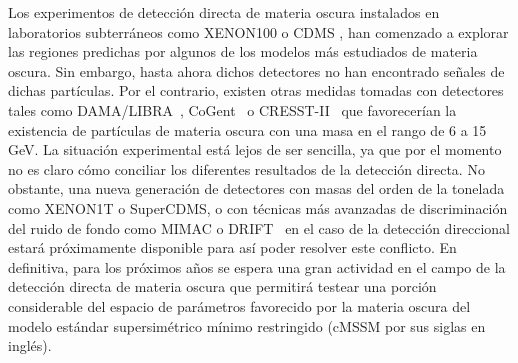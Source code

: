 Los experimentos de detección directa de materia oscura instalados en
laboratorios subterráneos como XENON100 \cite{Aprile:2011ts}
o CDMS \cite{Ahmed:2009zw,Ahmed:2010wy}, han
comenzado a explorar las regiones predichas por algunos de los modelos
más estudiados de materia oscura.
Sin embargo, hasta ahora dichos detectores no han encontrado señales
de dichas partículas. Por el contrario, existen otras medidas tomadas
con detectores tales como DAMA/LIBRA~\cite{Bernabei:2010mq},
CoGent~\cite{Aalseth:2011wp} o CRESST-II~\cite{Angloher:2011uu} que
favorecerían la existencia de partículas de materia oscura con una masa
en el rango de 6 a 15 GeV.
La situación experimental está lejos de ser sencilla, ya que por el momento
no es claro cómo conciliar los diferentes resultados de la detección directa.
No obstante, una nueva generación de detectores con masas del orden de la
tonelada como XENON1T o SuperCDMS, o con técnicas más avanzadas de
discriminación del ruido de fondo como MIMAC \cite{Billard:2011yf}
o DRIFT~\cite{Pipe:2010zz} en el caso de la detección direccional estará
próximamente disponible para así poder resolver este conflicto.
En definitiva, para los próximos años se espera una gran actividad en
el campo de la detección directa de materia oscura que permitirá
testear una porción considerable del espacio de parámetros favorecido por
la materia oscura del modelo estándar supersimétrico mínimo restringido
(cMSSM por sus siglas en inglés).\\ 

